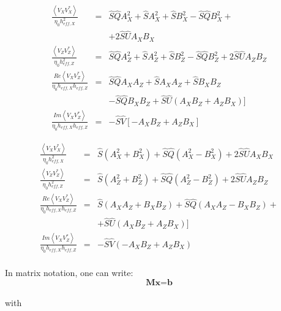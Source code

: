 \documentclass[a4paper,10pt]{thesis}
\begin{document}
\begin{eqnarray}
\frac{\left\langle V_X V_X^{*} \right\rangle }{\eta_0 h_{eff,X}^2}&=& \hat{S}\hat{Q}A^2_X+\hat{S}A^2_X + \hat{S}B^2_X-\hat{S}\hat{Q} B^2_X+\\
&&+ 2 \hat{S}\hat{U}A_X B_X \nonumber \\
\frac{\left\langle V_Z V_Z^{*} \right\rangle }{\eta_0 h_{eff,Z}^2}&=& \hat{S}\hat{Q}A^2_Z+\hat{S}A^2_Z + \hat{S}B^2_Z-\hat{S}\hat{Q} B^2_Z+ 2 \hat{S}\hat{U}A_Z B_Z  \\
\frac{Re \left\langle V_X V_Z^{*}\right\rangle }{\eta_0 h_{eff,X} h_{eff,Z}}&=& \hat{S}\hat{Q}A_X A_Z+ \hat{S}A_X A_Z +  \hat{S}B_X B_Z\\
&&-\hat{S}\hat{Q} B_X B_Z + \hat{S}\hat{U} (A_X B_Z + A_Z B_X)] \nonumber \\
\frac{Im \left\langle V_X V_Z^{*}\right\rangle }{\eta_0 h_{eff,X} h_{eff,Z}}&=& -\hat{S} \hat{V}[-A_X B_Z + A_Z B_X ]
\end{eqnarray}

\begin{eqnarray}
\frac{\left\langle V_X V_X^{*} \right\rangle }{\eta_0 h_{eff,X}^2}&=& \hat{S}(A^2_X+ B^2_X) +\hat{S}\hat{Q}(A^2_X- B^2_X)+ 2 \hat{S}\hat{U}A_X B_X  \\
\frac{\left\langle V_Z V_Z^{*} \right\rangle }{\eta_0 h_{eff,Z}^2}&=& \hat{S}(A^2_Z + B^2_Z) +\hat{S}\hat{Q}(A^2_Z - B^2_Z)+ 2 \hat{S}\hat{U}A_Z B_Z  \\
\frac{Re \left\langle V_X V_Z^{*}\right\rangle }{\eta_0 h_{eff,X} h_{eff,Z}}&=& \hat{S}(A_X A_Z +  B_X B_Z) + \hat{S}\hat{Q}(A_X A_Z -B_X B_Z)+\\
&&+ \hat{S}\hat{U} (A_X B_Z + A_Z B_X)] \nonumber \\
\frac{Im \left\langle V_X V_Z^{*}\right\rangle }{\eta_0 h_{eff,X} h_{eff,Z}}&=& -\hat{S} \hat{V}(-A_X B_Z + A_Z B_X )
\end{eqnarray}

\paragraph*{}
In matrix notation, one can write:\\
\begin{equation}\label{lineare_gleichung}
\textbf{M}\textbf{x}=\textbf{b}
\end{equation}

\paragraph*{}
with
\end{document}
